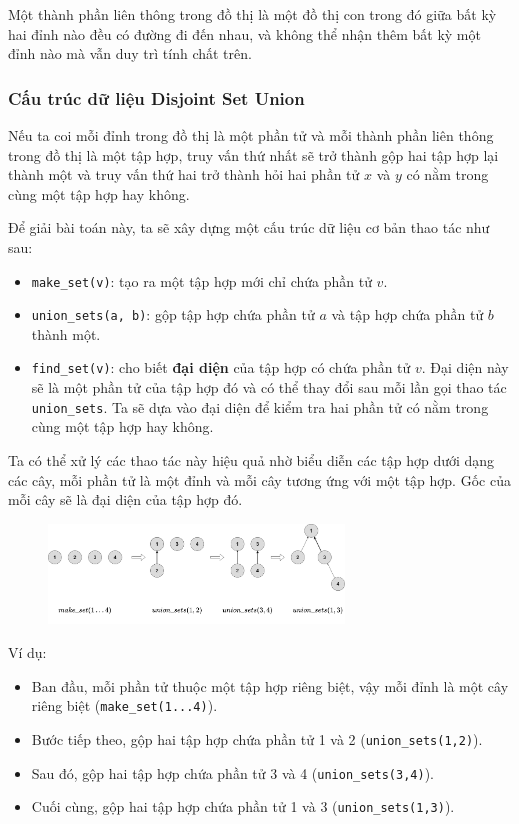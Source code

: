 \documentclass{article}
\begin{document}
Một thành phần liên thông trong đồ thị là một đồ thị con trong đó giữa bất kỳ hai đỉnh nào đều có đường đi đến nhau, và không thể nhận thêm bất kỳ một đỉnh nào mà vẫn duy trì tính chất trên.

\subsubsection{Cấu trúc dữ liệu Disjoint Set Union}

Nếu ta coi mỗi đỉnh trong đồ thị là một phần tử và mỗi thành phần liên thông trong đồ thị là một tập hợp, truy vấn thứ nhất sẽ trở thành gộp hai tập hợp lại thành một và truy vấn thứ hai trở thành hỏi hai phần tử $x$ và $y$ có nằm trong cùng một tập hợp hay không.

Để giải bài toán này, ta sẽ xây dựng một cấu trúc dữ liệu cơ bản thao tác như sau:
\begin{itemize}
    \item \texttt{make\_set(v)}: tạo ra một tập hợp mới chỉ chứa phần tử $v$.
    \item \texttt{union\_sets(a, b)}: gộp tập hợp chứa phần tử $a$ và tập hợp chứa phần tử $b$ thành một.
    \item \texttt{find\_set(v)}: cho biết \textbf{đại diện} của tập hợp có chứa phần tử $v$. Đại diện này sẽ là một phần tử của tập hợp đó và có thể thay đổi sau mỗi lần gọi thao tác \texttt{union\_sets}. Ta sẽ dựa vào đại diện để kiểm tra hai phần tử có nằm trong cùng một tập hợp hay không.
\end{itemize}

Ta có thể xử lý các thao tác này hiệu quả nhờ biểu diễn các tập hợp dưới dạng các cây, mỗi phần tử là một đỉnh và mỗi cây tương ứng với một tập hợp. Gốc của mỗi cây sẽ là đại diện của tập hợp đó.

\begin{figure}[h]
    \centering
    \includegraphics[width=0.7\textwidth]{img/b8/disjoint-set-union_img1.png}
\end{figure}

Ví dụ:
\begin{itemize}
    \item Ban đầu, mỗi phần tử thuộc một tập hợp riêng biệt, vậy mỗi đỉnh là một cây riêng biệt (\texttt{make\_set(1...4)}).
    \item Bước tiếp theo, gộp hai tập hợp chứa phần tử 1 và 2 (\texttt{union\_sets(1,2)}).
    \item Sau đó, gộp hai tập hợp chứa phần tử 3 và 4 (\texttt{union\_sets(3,4)}).
    \item Cuối cùng, gộp hai tập hợp chứa phần tử 1 và 3 (\texttt{union\_sets(1,3)}).
\end{itemize}
\end{document}
